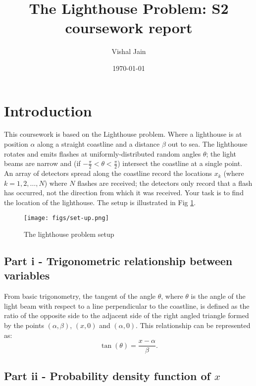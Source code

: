 \documentclass[11pt]{article}
\title{The Lighthouse Problem: S2 coursework report}
\author{Vishal Jain}
\date{\today}
\begin{document}
\maketitle

\tableofcontents

\newpage

\section{Introduction}
This coursework is based on the Lighthouse problem. Where a lighthouse is at position \( \alpha \) along a straight coastline and a distance \( \beta \) out to sea. The lighthouse rotates and emits flashes at uniformly-distributed random angles \( \theta \); the light beams are narrow and (if \( -\frac{\pi}{2} < \theta < \frac{\pi}{2} \)) intersect the coastline at a single point. An array of detectors spread along the coastline record the locations \( x_k \) (where \( k = 1, 2, \ldots, N \)) where \( N \) flashes are received; the detectors only record that a flash has occurred, not the direction from which it was received. Your task is to find the location of the lighthouse. The setup is illustrated in Fig \ref{fig:setup}.

\begin{figure}[H]
    \centering
    \texttt{[image: figs/set-up.png]}
    \caption{The lighthouse problem setup}
    \label{fig:setup}
\end{figure}


\subsection{Part i - Trigonometric relationship between variables}

From basic trigonometry, the tangent of the angle \( \theta \), where \( \theta \) is the angle of the light beam with respect to a line perpendicular to the coastline, is defined as the ratio of the opposite side to the adjacent side of the right angled triangle formed by the points $(\alpha,\beta)$, $(x,0)$ and $(\alpha,0)$. This relationship can be represented as:
\[
\tan(\theta) = \frac{x-\alpha}{\beta}.
\]

\subsection{Part ii - Probability density function of \( x \)}
\end{document}
